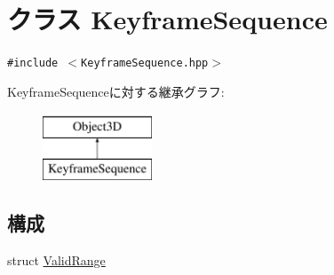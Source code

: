 \hypertarget{classm3g_1_1KeyframeSequence}{
\section{クラス KeyframeSequence}
\label{classm3g_1_1KeyframeSequence}
}
{\tt \#include $<$KeyframeSequence.hpp$>$}

KeyframeSequenceに対する継承グラフ:\begin{figure}[H]
\begin{center}
\leavevmode
\includegraphics[height=2cm]{classm3g_1_1KeyframeSequence}
\end{center}
\end{figure}
\subsection*{構成}
\begin{CompactItemize}
\item 
struct \hyperlink{structm3g_1_1KeyframeSequence_1_1ValidRange}{ValidRange}
\end{CompactItemize}
